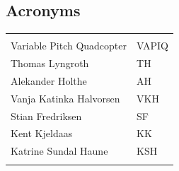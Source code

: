 \documentclass{article}
\begin{document}
\vspace*{3.0 cm}

\begin{center}
\section*{\textbf{Acronyms}}
\begin{tabular}{ll}
\rowcolor{cadetgrey}
    &   \\
Variable Pitch Quadcopter   & VAPIQ \\\rowcolor{gainsboro}
Thomas Lyngroth       & TH          \\ 
Alekander Holthe      & AH          \\\rowcolor{gainsboro}
Vanja Katinka Halvorsen     & VKH   \\
Stian Fredriksen      & SF          \\\rowcolor{gainsboro}
Kent Kjeldaas         & KK          \\
Katrine Sundal Haune  & KSH         \\\rowcolor{gainsboro}
\end{tabular}                                                             
\end{center}
\newpage




%


\tableofcontents
\newpage




%

%

%
\end{document}
